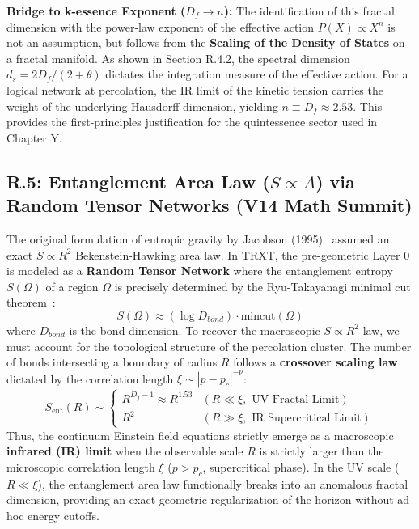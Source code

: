 \textbf{Bridge to k-essence Exponent ($D_f \to n$):}
The identification of this fractal dimension with the power-law exponent of the effective action $P(X) \propto X^{n}$ is not an assumption, but follows from the \textbf{Scaling of the Density of States} on a fractal manifold. As shown in Section R.4.2, the spectral dimension $d_s = 2 D_f / (2 + \theta)$ dictates the integration measure of the effective action. For a logical network at percolation, the IR limit of the kinetic tension carries the weight of the underlying Hausdorff dimension, yielding $n \equiv D_f \approx 2.53$. This provides the first-principles justification for the quintessence sector used in Chapter Y.

\subsection{R.5: Entanglement Area Law ($S \propto A$) via Random Tensor Networks (V14 Math Summit)}
\label{sec:entanglement_area_law}
The original formulation of entropic gravity by Jacobson (1995)~\cite{jacobson} assumed an exact $S \propto R^2$ Bekenstein-Hawking area law. In TRXT, the pre-geometric Layer 0 is modeled as a \textbf{Random Tensor Network} where the entanglement entropy $S(\Omega)$ of a region $\Omega$ is precisely determined by the Ryu-Takayanagi minimal cut theorem~\cite{ryu2006}: 
\begin{equation}
    S(\Omega) \approx (\log D_{bond}) \cdot \text{mincut}(\Omega)
\end{equation}
where $D_{bond}$ is the bond dimension. To recover the macroscopic $S \propto R^2$ law, we must account for the topological structure of the percolation cluster. The number of bonds intersecting a boundary of radius $R$ follows a \textbf{crossover scaling law} dictated by the correlation length $\xi \sim |p - p_c|^{-\nu}$:
\begin{equation}
    S_{\text{ent}}(R) \sim 
    \begin{cases}
    R^{D_f - 1} \approx R^{1.53} & (R \ll \xi, \text{ UV Fractal Limit}) \\
    R^{2} & (R \gg \xi, \text{ IR Supercritical Limit})
    \end{cases}
\end{equation}
Thus, the continuum Einstein field equations strictly emerge as a macroscopic \textbf{infrared (IR) limit} when the observable scale $R$ is strictly larger than the microscopic correlation length $\xi$ ($p > p_c$, supercritical phase). In the UV scale ($R \ll \xi$), the entanglement area law functionally breaks into an anomalous fractal dimension, providing an exact geometric regularization of the horizon without ad-hoc energy cutoffs.
